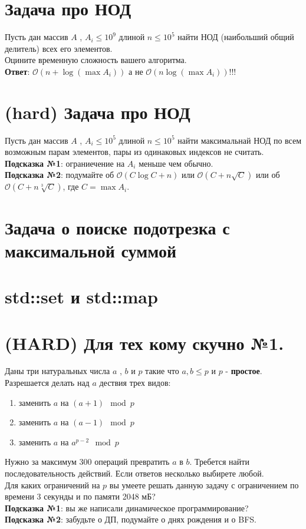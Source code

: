 \documentclass[12pt]{article}
\begin{document}
    \section{Задача про НОД} Пусть дан массив $A$ , $A_i \leq 10^9$  длиной $n \leq 10^5$ найти НОД (наибольший общий делитель) всех его элементов.
    \\
    Оцините временную сложность вашего алгоритма.
    \\
    \textbf{Ответ}: $\mathcal{O}(n + \log (\max{A_i}))$ а не $\mathcal{O}(n \log (\max{A_i}))$!!!
    
    \section{(hard) Задача про НОД}
    Пусть дан массив $A$ , $A_i \leq 10^5$  длиной $n \leq 10^5$ найти максимальнай НОД по всем возможным парам элементов, пары из одинаковых индексов не считать.
    \\
    \textbf{Подсказка №1}: ограниечение на $A_i$ меньше чем обычно.
    \\
    \textbf{Подсказка №2}: подумайте об $\mathcal{O}(C \log C + n)$ или $\mathcal{O}(C+ n \sqrt C)$ или об $\mathcal{O}(C+ n \sqrt[3] C)$, где $C = \max A_i$.
    
    \section{Задача о поиске подотрезка с максимальной суммой}
    
    \section{std::set и std::map}
     
    \section{(HARD) Для тех кому скучно №1.}
    Даны три натуральных числа $a$ , $b$ и $p$ такие что $a , b \leq p$ и $p$ -  \textbf{простое}.
    Разрешается делать над $a$ дествия трех видов:
    \begin{enumerate} 
        \item заменить $a$ на $(a + 1)\mod p$
        \item заменить $a$ на $(a - 1)\mod p$
        \item заменить $a$ на $a ^ {p -2}\mod p$
    \end{enumerate}
    Нужно за максимум $300$ операций превратить $a$ в $b$. Требется найти последовательность действий.
    Если ответов несколько выбирете любой.
    \\
    Для каких ограничений на $p$ вы умеете решать данную задачу с ограничением по времени 3 секунды и по памяти 2048 мБ?
    \\
    \textbf{Подсказка №1}: вы же написали динамическое программирование?
    \\
    \textbf{Подсказка №2}: забудьте о ДП,
    подумайте о днях рождения и о BFS.
    
    
\end{document}
